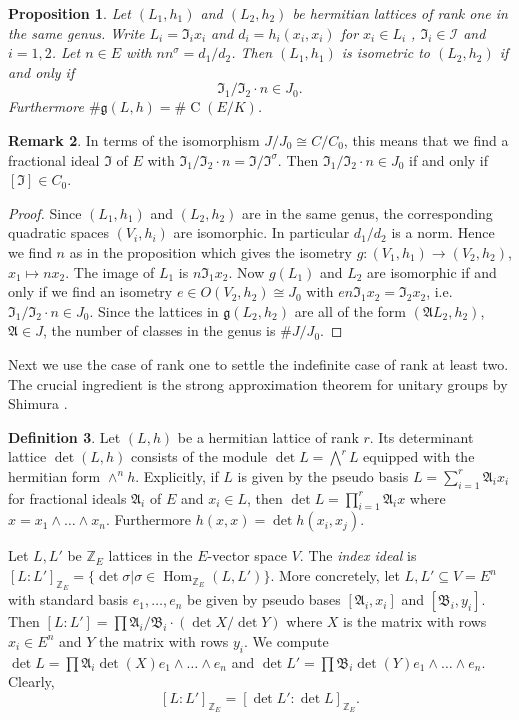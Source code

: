 \documentclass{amsart}
\theoremstyle{definition}
\newtheorem{definition}{Definition}[section]
\newtheorem{remark}[definition]{Remark}
\theoremstyle{plain}
\newtheorem{proposition}[definition]{Proposition}
\DeclareMathOperator{\Cl}{C}
\DeclareMathOperator{\Hom}{Hom}
\newcommand{\ZZ}{\mathbb{Z}}
\begin{document}
\begin{proposition}\label{prop:genus1}
Let $(L_1,h_1)$ and $(L_2,h_2)$ be hermitian lattices of rank one in the same genus.
Write $L_i=\mathfrak{I}_i x_i$ and $d_i=h_i(x_i,x_i)$ for $x_i \in L_i$ , $\mathfrak{I}_i \in \mathcal{I}$ and $i=1,2$. Let $n \in E$ with $n n^\sigma = d_1/d_2$.
Then $(L_1,h_1)$ is isometric to $(L_2,h_2)$ if and only if
\[\mathfrak{I}_1/\mathfrak{I}_2 \cdot n \in J_0.\]
Furthermore $\# \mathfrak{g}(L,h) = \# \Cl(E/K)$.
\end{proposition}
\begin{remark}
In terms of the isomorphism $J/J_0 \cong C/C_0$, this means that we find a fractional ideal $\mathfrak{I}$ of $E$ with $\mathfrak{I}_1/\mathfrak{I}_2 \cdot n =\mathfrak{I}/\mathfrak{I}^\sigma$. Then $\mathfrak{I}_1/\mathfrak{I}_2 \cdot n \in J_0$ if and only if $[\mathfrak{I}] \in C_0$.
\end{remark}
\begin{proof}
 Since $(L_1,h_1)$ and $(L_2,h_2)$ are in the same genus, the corresponding quadratic spaces $(V_i,h_i)$ are isomorphic. In particular $d_1/d_2$ is a norm. Hence we find $n$ as in the proposition which gives the isometry $g\colon (V_1,h_1) \rightarrow (V_2,h_2)$, $x_1 \mapsto n x_2$. The image of $L_1$ is $n \mathfrak{I}_1 x_2$. Now $g(L_1)$ and $L_2$ are isomorphic if and only if we find an isometry $e \in O(V_2,h_2)\cong J_0$ with $e n \mathfrak{I}_1 x_2 = \mathfrak{I}_2 x_2$, i.e. $\mathfrak{I}_1/\mathfrak{I}_2 \cdot n \in J_0$.
 Since the lattices in $\mathfrak{g}(L_2,h_2)$ are all of the form
 $(\mathfrak{A}L_2,h_2)$, $\mathfrak{A} \in J$, the number of classes in the genus is $\# J / J_0$.
\end{proof}
Next we use the case of rank one to settle the indefinite case of rank at least two. The crucial ingredient is the strong approximation theorem for unitary groups by Shimura \cite{shimura:unitary}.
\begin{definition}
Let $(L,h)$ be a hermitian lattice of rank $r$. Its determinant lattice $\det(L,h)$ consists of the module $\det L = \bigwedge^r L$ equipped with the hermitian form $\wedge^{n}h$.
Explicitly, if $L$ is given by the pseudo basis $L = \sum_{i=1}^r \mathfrak{A}_i x_i$ for fractional ideals $\mathfrak{A}_i$ of $E$ and $x_i \in L$, then $\det L = \prod_{i=1}^r \mathfrak{A}_i x$ where $x=x_1 \wedge \dots \wedge x_n$. Furthermore $h(x,x) = \det h(x_i,x_j)$.
\end{definition}
Let $L,L'$ be $\ZZ_E$ lattices in the $E$-vector space $V$.
The \emph{index ideal} is $[L: L']_{\ZZ_E}=\{\det \sigma | \sigma \in \Hom_{\ZZ_E}(L,L')\}$.
More concretely, let $L,L'\subseteq V=E^n$ with standard basis $e_1,\dots , e_n$ be given by pseudo bases $[\mathfrak{A}_i,x_i]$ and $[\mathfrak{B}_i,y_i]$. Then
$[L:L'] = \prod \mathfrak{A}_i / \mathfrak{B}_i \cdot (\det X / \det Y)$
where $X$ is the matrix with rows $x_i \in E^n$ and $Y$ the matrix with rows $y_i$.
We compute $\det L= \prod \mathfrak{A}_i \det(X) e_1 \wedge \dots \wedge e_n$
and $\det L'= \prod \mathfrak{B}_i \det(Y) e_1 \wedge \dots \wedge e_n$.
Clearly, \[[L: L']_{\ZZ_E}=[\det L': \det L]_{\ZZ_E}.\]
\end{document}
